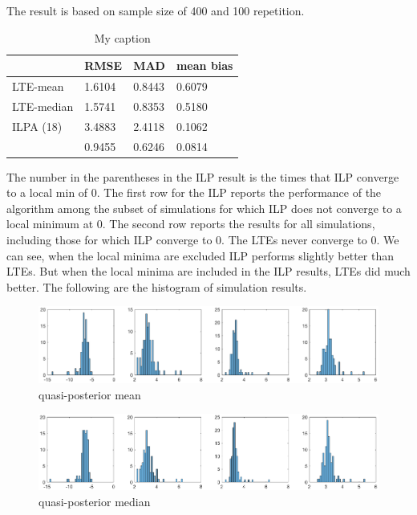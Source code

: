 \documentclass[12pt]{article}
\theoremstyle{plain} \newtheorem{theorem}{Theorem}
\theoremstyle{definition} \newtheorem{definition}{Definition}
\begin{document}
The result is based on sample size of 400 and 100 repetition.
\begin{table}[h]
\centering
\caption{My caption}
\label{my-label}
\begin{tabular}{llll}
\hline
           & RMSE   & MAD    & mean bias \\ \hline
LTE-mean   & 1.6104 & 0.8443 & 0.6079    \\ \hline
LTE-median & 1.5741 & 0.8353 & 0.5180    \\ \hline
ILPA (18)  & 3.4883 & 2.4118 & 0.1062    \\ \hline
           & 0.9455 & 0.6246 & 0.0814    \\ \hline
\end{tabular}
\end{table}

The number in the parentheses in the ILP result is the times that ILP converge to a local min of 0. The first row for the ILP reports the performance of the algorithm among the subset of simulations for which ILP does not converge to a local minimum at 0. The second row reports the results for all simulations, including those for which ILP converge to 0. The LTEs never converge to 0. We can see, when the local minima are excluded ILP performs slightly better than LTEs. But when the local minima are included in the ILP results, LTEs did much better. The following are the histogram of simulation results.

\begin{figure}[hp]
    \centering
    \includegraphics[width=1.2\textwidth]{figures/lte-mean.eps}
    \caption{quasi-posterior mean}
    \label{fig:lte-mean}
\end{figure}

\begin{figure}[hp]
    \centering
    \includegraphics[width=1.2\textwidth]{figures/lte-median.eps}
    \caption{quasi-posterior median}
    \label{fig:lte-median}
\end{figure}
\end{document}
